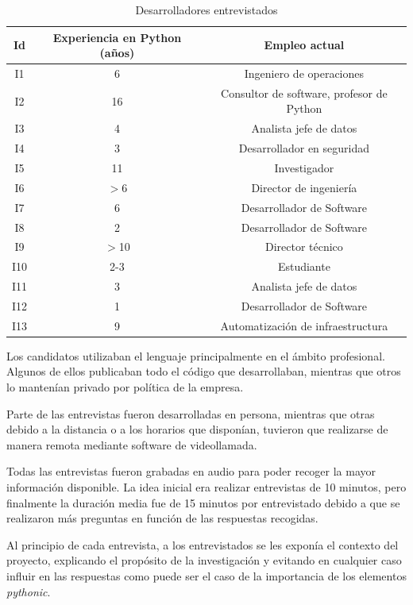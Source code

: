 \documentclass[a4paper, 12pt]{book}
\begin{document}
\begin{table}
\begin{tabular} { | c | c | c | }
\hline
\textbf{Id} & \textbf{Experiencia en Python (años)} & \textbf{Empleo actual} \\
\hline
I1 &  6 & Ingeniero de operaciones \\
I2 & 16 & Consultor de software, profesor de Python \\
I3 &  4 & Analista jefe de datos \\
I4 &  3 & Desarrollador en seguridad \\
I5 & 11 & Investigador \\
I6 & $>$6 & Director de ingeniería \\
I7 &  6 & Desarrollador de Software \\
I8 &  2  & Desarrollador de Software \\
I9 & $>$10 & Director técnico \\
I10 & 2-3 & Estudiante \\
I11 & 3 & Analista jefe de datos \\
I12 & 1 & Desarrollador de Software \\
I13 & 9 & Automatización de infraestructura \\ 
\hline
\end{tabular}
\caption{Desarrolladores entrevistados}
\label{table:desarroladores}
\end{table}

Los candidatos utilizaban el lenguaje principalmente en el ámbito profesional. Algunos de ellos publicaban todo el código que desarrollaban, mientras que otros lo mantenían privado por política de la empresa.

Parte de las entrevistas fueron desarrolladas en persona, mientras que otras debido a la distancia o a los horarios que disponían, tuvieron que realizarse de manera remota mediante software de videollamada.

Todas las entrevistas fueron grabadas en audio para poder recoger la mayor información disponible. La idea inicial era realizar entrevistas de 10 minutos, pero finalmente la duración media fue de 15 minutos por entrevistado debido a que se realizaron más preguntas en función de las respuestas recogidas.

Al principio de cada entrevista, a los entrevistados se les exponía el contexto del proyecto, explicando el propósito de la investigación y evitando en cualquier caso influir en las respuestas como puede ser el caso de la importancia de los elementos \textit{pythonic}.
\end{document}
